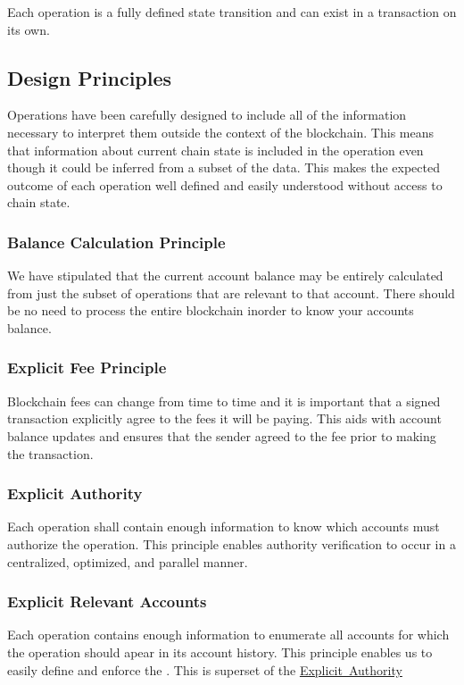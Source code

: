 Each operation is a fully defined state transition and can exist in a transaction on its own.\hypertarget{group__operations_operation_design_principles}{}\subsection{Design Principles}\label{group__operations_operation_design_principles}
Operations have been carefully designed to include all of the information necessary to interpret them outside the context of the blockchain. This means that information about current chain state is included in the operation even though it could be inferred from a subset of the data. This makes the expected outcome of each operation well defined and easily understood without access to chain state.\hypertarget{group__operations_balance_calculation}{}\subsubsection{Balance Calculation Principle}\label{group__operations_balance_calculation}
We have stipulated that the current account balance may be entirely calculated from just the subset of operations that are relevant to that account. There should be no need to process the entire blockchain inorder to know your account\textquotesingle{}s balance.\hypertarget{group__operations_fee_calculation}{}\subsubsection{Explicit Fee Principle}\label{group__operations_fee_calculation}
Blockchain fees can change from time to time and it is important that a signed transaction explicitly agree to the fees it will be paying. This aids with account balance updates and ensures that the sender agreed to the fee prior to making the transaction.\hypertarget{group__operations_defined_authority}{}\subsubsection{Explicit Authority}\label{group__operations_defined_authority}
Each operation shall contain enough information to know which accounts must authorize the operation. This principle enables authority verification to occur in a centralized, optimized, and parallel manner.\hypertarget{group__operations_relevancy_principle}{}\subsubsection{Explicit Relevant Accounts}\label{group__operations_relevancy_principle}
Each operation contains enough information to enumerate all accounts for which the operation should apear in its account history. This principle enables us to easily define and enforce the . This is superset of the \mbox{\hyperlink{group__operations_defined_authority}{Explicit Authority}} 